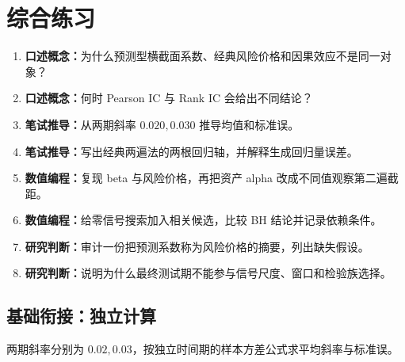 \section{综合练习}
\begin{enumerate}[leftmargin=*]
  \item \textbf{口述概念：}为什么预测型横截面系数、经典风险价格和因果效应不是同一对象？
  \item \textbf{口述概念：}何时 Pearson IC 与 Rank IC 会给出不同结论？
  \item \textbf{笔试推导：}从两期斜率 $0.020,0.030$ 推导均值和标准误。
  \item \textbf{笔试推导：}写出经典两遍法的两根回归轴，并解释生成回归量误差。
  \item \textbf{数值编程：}复现 beta 与风险价格，再把资产 alpha 改成不同值观察第二遍截距。
  \item \textbf{数值编程：}给零信号搜索加入相关候选，比较 BH 结论并记录依赖条件。
  \item \textbf{研究判断：}审计一份把预测系数称为风险价格的摘要，列出缺失假设。
  \item \textbf{研究判断：}说明为什么最终测试期不能参与信号尺度、窗口和检验族选择。
\end{enumerate}

\subsection*{基础衔接：独立计算}
两期斜率分别为 $0.02,0.03$，按独立时间期的样本方差公式求平均斜率与标准误。
